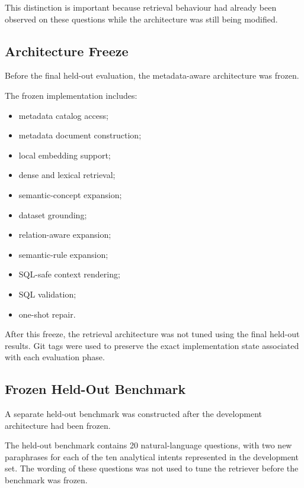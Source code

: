 This distinction is important because retrieval behaviour had already been
observed on these questions while the architecture was still being modified.


\subsection{Architecture Freeze}

Before the final held-out evaluation, the metadata-aware architecture was
frozen.

The frozen implementation includes:

\begin{itemize}

    \item metadata catalog access;
    \item metadata document construction;
    \item local embedding support;
    \item dense and lexical retrieval;
    \item semantic-concept expansion;
    \item dataset grounding;
    \item relation-aware expansion;
    \item semantic-rule expansion;
    \item SQL-safe context rendering;
    \item SQL validation;
    \item one-shot repair.

\end{itemize}

After this freeze, the retrieval architecture was not tuned using the final
held-out results. Git tags were used to preserve the exact implementation
state associated with each evaluation phase.


\subsection{Frozen Held-Out Benchmark}

A separate held-out benchmark was constructed after the development
architecture had been frozen.

The held-out benchmark contains 20 natural-language questions, with two new
paraphrases for each of the ten analytical intents represented in the
development set. The wording of these questions was not used to tune the
retriever before the benchmark was frozen.

